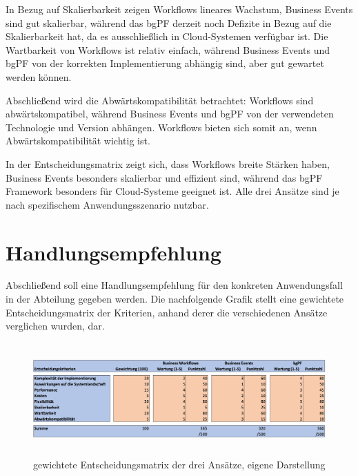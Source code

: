 In Bezug auf Skalierbarkeit zeigen Workflows lineares Wachstum, Business Events sind gut skalierbar, während das bgPF derzeit noch Defizite in Bezug auf die Skalierbarkeit hat, da es ausschlie{\ss}lich in Cloud-Systemen verfügbar ist. Die Wartbarkeit von Workflows ist relativ einfach, während Business Events und bgPF von der korrekten Implementierung abhängig sind, aber gut gewartet werden können.

Abschlie{\ss}end wird die Abwärtskompatibilität betrachtet: Workflows sind abwärtskompatibel, während Business Events und bgPF von der verwendeten Technologie und Version abhängen. Workflows bieten sich somit an, wenn Abwärtskompatibilität wichtig ist.

In der Entscheidungsmatrix zeigt sich, dass Workflows breite Stärken haben, Business Events besonders skalierbar und effizient sind, während das bgPF Framework besonders für Cloud-Systeme geeignet ist. Alle drei Ansätze sind je nach spezifischem Anwendungsszenario nutzbar.

\section{Handlungsempfehlung}

Abschlie{\ss}end soll eine Handlungsempfehlung für den konkreten Anwendungsfall in der Abteilung gegeben werden. Die nachfolgende Grafik stellt eine gewichtete Entscheidungsmatrix der Kriterien, anhand derer die verschiedenen Ansätze verglichen wurden, dar.

\begin{figure}[H]
 \centering
 \includegraphics[height=4.3cm]{Bilder/Handlungsempfehlung_Entscheidungsmatrix.png}
 \caption[gewichtete Entscheidungsmatrix der drei Ansätze]{gewichtete Entscheidungsmatrix der drei Ansätze, eigene Darstellung}
 \label{fig:iso_norm}
\end{figure}

